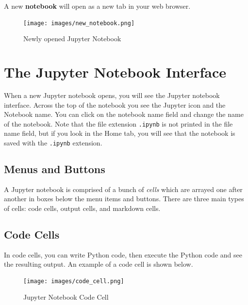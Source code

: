 \documentclass{book}
\begin{document}
A new \textbf{notebook} will open as a new tab in your web browser.

\begin{figure}
\centering
\texttt{[image: images/new\_notebook.png]}
\caption{Newly opened Jupyter Notebook}
\end{figure}
    




    
        \section{The Jupyter Notebook
Interface}\label{the-jupyter-notebook-interface}
    




    
        When a new Jupyter notebook opens, you will see the Jupyter notebook
interface. Across the top of the notebook you see the Jupyter icon and
the Notebook name. You can click on the notebook name field and change
the name of the notebook. Note that the file extension
\lstinline!.ipynb! is not printed in the file name field, but if you
look in the Home tab, you will see that the notebook is saved with the
\lstinline!.ipynb! extension.
    




    
        \subsection{Menus and Buttons}\label{menus-and-buttons}

A Jupyter notebook is comprised of a bunch of \emph{cells} which are
arrayed one after another in boxes below the menu items and buttons.
There are three main types of cells: code cells, output cells, and
markdown cells.
    




    
        \subsection{Code Cells}\label{code-cells}

In code cells, you can write Python code, then execute the Python code
and see the resulting output. An example of a code cell is shown below.

\begin{figure}
\centering
\texttt{[image: images/code\_cell.png]}
\caption{Jupyter Notebook Code Cell}
\end{figure}
\end{document}

